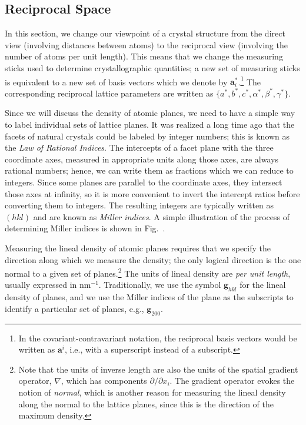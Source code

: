 \subsection{Reciprocal Space}
In this section, we change our viewpoint of a crystal structure from the direct view (involving distances between atoms) to the reciprocal view (involving the number of atoms per unit length).  This means that we change the measuring sticks used to determine crystallographic quantities; a new set of measuring sticks is equivalent to a new set of basis vectors which we denote by $\mathbf{a}^{\ast}_i$.\footnote{In the covariant-contravariant notation, the reciprocal basis vectors would be written as $\mathbf{a}^i$, i.e., with a superscript instead of a subscript.}  The corresponding reciprocal lattice parameters are written as $\{a^{\ast},b^{\ast},c^{\ast},\alpha^{\ast},\beta^{\ast},\gamma^{\ast}\}$.

Since we will discuss the density of atomic planes, we need to have a simple way to label individual sets of lattice planes.  It was realized a long time ago that the facets of natural crystals could be labeled by integer numbers; this is known as the \textit{Law of Rational Indices}.  The intercepts of a facet plane with the three coordinate axes, measured in appropriate units along those axes, are always rational numbers; hence, we can write them as fractions which we can reduce to integers.  Since some planes are parallel to the coordinate axes, they intersect those axes at infinity, so it is more convenient to invert the intercept ratios before converting them to integers.  The resulting integers are typically written as $(hkl)$ and are known as \textit{Miller indices}.  A simple illustration of the process of determining Miller indices is shown in Fig.~.

Measuring the lineal density of atomic planes requires that we specify the direction along which we measure the density; the only logical direction is the one normal to a given set of planes.\footnote{Note that the units of inverse length are also the units of the spatial gradient operator, $\nabla$, which has components $\partial/\partial x_i$.  The gradient operator evokes the notion of \textit{normal}, which is another reason for measuring the lineal density along the normal to the lattice planes, since this is the direction of the maximum density.} The units of lineal density are \textit{per unit length}, usually expressed in nm$^{-1}$.  Traditionally, we use the symbol $\mathbf{g}_{hkl}$ for the lineal density of planes, and we use the Miller indices of the plane as the subscripts to identify a particular set of planes, e.g., $\mathbf{g}_{200}$.

